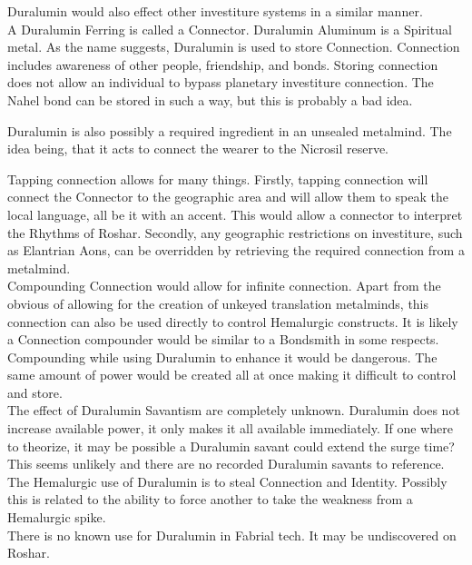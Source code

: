 \documentclass[conference]{IEEEtran}
\begin{document}
Duralumin would also effect other investiture systems in a similar manner.\\

A Duralumin Ferring is called a Connector.  Duralumin Aluminum is a Spiritual metal.  As the name suggests, Duralumin is used to store Connection.  Connection includes awareness of other people, friendship, and bonds.  Storing connection does not allow an individual to bypass planetary investiture connection.
The Nahel bond can be stored in such a way, but this is probably a bad idea.

Duralumin is also possibly a required ingredient in an unsealed metalmind.  The idea being, that it acts to connect the wearer to the Nicrosil reserve.

Tapping connection allows for many things.  Firstly, tapping connection will connect the Connector to the geographic area and will allow them to speak the local language, all be it with an accent.  This would allow a connector to interpret the Rhythms of Roshar. Secondly, any geographic restrictions on investiture, such as Elantrian Aons, can be overridden by retrieving the required connection from a metalmind.  \\

Compounding Connection would allow for infinite connection.  Apart from the obvious of allowing for the creation of unkeyed translation metalminds, this connection can also be used directly to control Hemalurgic constructs.
It is likely a Connection compounder would be similar to a Bondsmith in some respects.\\

Compounding while using Duralumin to enhance it would be dangerous.  The same amount of power would be created all at once making it difficult to control and store.\\

The effect of Duralumin Savantism are completely unknown.  Duralumin does not increase available power, it only makes it all available immediately.  If one where to theorize, it may be possible a Duralumin savant could extend the surge time?  This seems unlikely and there are no recorded Duralumin savants to reference.\\

The Hemalurgic use of Duralumin is to steal Connection and Identity.  Possibly this is related to the ability to force another to take the weakness from a Hemalurgic spike.\\

There is no known use for Duralumin in Fabrial tech.  It may be undiscovered on Roshar.
\end{document}
